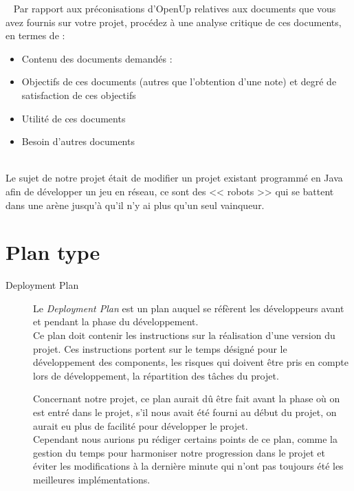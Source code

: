 \documentclass[a4paper, 12pt]{article}
\begin{document}
	\maketitle
~\newline
Par rapport aux préconisations d'OpenUp relatives aux documents que vous avez fournis sur votre projet, procédez à une analyse critique de ces documents, en termes de : 
\begin{itemize}
	\item Contenu des documents demandés :
	\item Objectifs de ces documents (autres que l'obtention d'une note) et degré de satisfaction de ces objectifs 
	\item Utilité de ces documents 
	\item Besoin d’autres documents 
\end{itemize}
~\\
Le sujet de notre projet était de modifier un projet existant programmé en Java afin de développer un jeu en réseau, ce sont des << robots >> qui se
battent dans une arène jusqu'à qu'il n'y ai plus qu'un seul vainqueur.

		\section{Plan type}
\begin{description}
	\item[Deployment Plan] Le \textit{Deployment Plan} est un plan auquel se réfèrent les développeurs avant et pendant la phase du développement. \\ 
		Ce plan doit contenir les instructions sur la réalisation d'une version du projet. Ces instructions portent sur le temps désigné pour le développement des components, les risques qui doivent être pris en compte lors de développement, la répartition des tâches du projet.

Concernant notre projet, ce plan aurait dû être fait avant la phase où on est entré dans le projet, s'il nous avait été fourni au  début du projet, on
aurait eu plus de facilité pour développer le projet.\\ 
Cependant nous aurions pu rédiger certains points de ce plan, comme la gestion du temps pour harmoniser notre progression dans le projet et éviter les
modifications à la dernière minute qui n'ont pas toujours été les meilleures implémentations.
\end{description}
\end{document}
